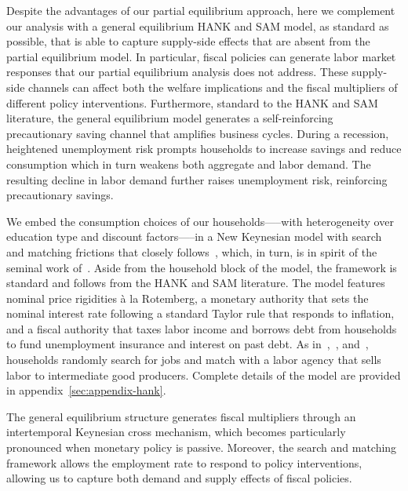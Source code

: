 \documentclass[qe]{econsocart}
\begin{document}
Despite the advantages of our partial equilibrium approach, here we complement our analysis with a general equilibrium HANK and SAM model, as standard as possible, that is able to capture supply-side effects that are absent from the partial equilibrium model. In particular, fiscal policies can generate labor market responses that our partial equilibrium analysis does not address. These supply-side channels can affect both the welfare implications and the fiscal multipliers of different policy interventions. Furthermore, standard to the HANK and SAM literature, the general equilibrium model generates a self-reinforcing precautionary saving channel that amplifies business cycles. During a recession, heightened unemployment risk prompts households to increase savings and reduce consumption which in turn weakens both aggregate and labor demand. The resulting decline in labor demand further raises unemployment risk, reinforcing precautionary savings.

We embed the consumption choices of our households—--with heterogeneity over education type and discount factors—--in a New Keynesian model with search and matching frictions that closely follows~\cite{Du2024}, which, in turn, is in spirit of the seminal work of~\cite{Ravn2017,Ravn2021}. Aside from the household block of the model, the framework is standard and follows from the HANK and SAM literature. The model features nominal price rigidities \`{a} la Rotemberg, a monetary authority that sets the nominal interest rate following a standard Taylor rule that responds to inflation, and a fiscal authority that taxes labor income and borrows debt from households to fund unemployment insurance and interest on past debt. As in~\cite{Gornemann2021},~\cite{Bardoczy2022}, and~\cite{gravesUnemployment}, households randomly search for jobs and match with a labor agency that sells labor to intermediate good producers. Complete details of the model are provided in appendix~\ref{sec:appendix-hank}.

The general equilibrium structure generates fiscal multipliers through an intertemporal Keynesian cross mechanism, which becomes particularly pronounced when monetary policy is passive. Moreover, the search and matching framework allows the employment rate to respond to policy interventions, allowing us to capture both demand and supply effects of fiscal policies.
\end{document}

